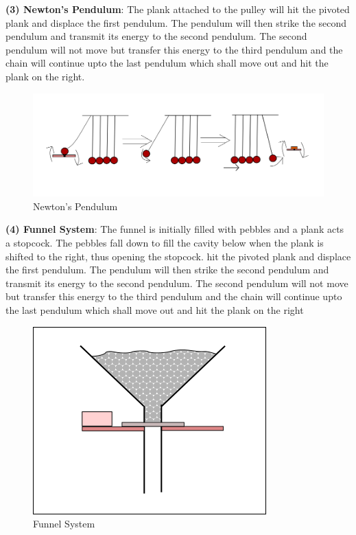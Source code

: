 \documentclass{article}
\begin{document}
{\bf (3) Newton's Pendulum}: The plank attached to the pulley will hit the pivoted plank and displace the first pendulum. The pendulum will then strike the second pendulum and transmit its energy to the second pendulum. The second pendulum will not move but transfer this energy to the third pendulum and the chain will continue upto the last pendulum which shall move out and hit the plank on the right.
\begin{figure} [h]
    \centering
    \includegraphics [scale=0.2] {images/newton_pendulum.png}
    \caption{Newton's Pendulum}
\end{figure} 
\vspace{1cm}

{\bf (4) Funnel System}: The funnel is initially filled with pebbles and a plank acts a stopcock. The pebbles fall down to fill the cavity below when the plank is shifted to the right, thus opening the stopcock.  hit the pivoted plank and displace the first pendulum. The pendulum will then strike the second pendulum and transmit its energy to the second pendulum. The second pendulum will not move but transfer this energy to the third pendulum and the chain will continue upto the last pendulum which shall move out and hit the plank on the right
\begin{figure} [h]
    \centering
    \includegraphics [scale=0.2] {images/funnel_system.png}
    \caption{Funnel System}
\end{figure} 
\end{document}
